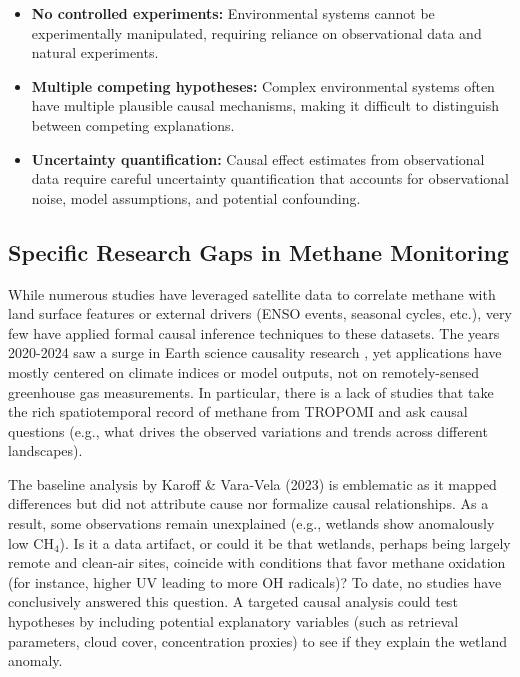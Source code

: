 \begin{itemize}
	\item \textbf{No controlled experiments:} Environmental systems cannot be experimentally manipulated, requiring reliance on observational data and natural experiments.

	\item \textbf{Multiple competing hypotheses:} Complex environmental systems often have multiple plausible causal mechanisms, making it difficult to distinguish between competing explanations.

	\item \textbf{Uncertainty quantification:} Causal effect estimates from observational data require careful uncertainty quantification that accounts for observational noise, model assumptions, and potential confounding.
\end{itemize}

\subsection{Specific Research Gaps in Methane Monitoring}

While numerous studies have leveraged satellite data to correlate methane with land surface features or external drivers (ENSO events, seasonal cycles, etc.), very few have applied formal causal inference techniques to these datasets. The years 2020-2024 saw a surge in Earth science causality research \cite{Runge2019}, yet applications have mostly centered on climate indices or model outputs, not on remotely-sensed greenhouse gas measurements. In particular, there is a lack of studies that take the rich spatiotemporal record of methane from TROPOMI and ask causal questions (e.g., what drives the observed variations and trends across different landscapes).

The baseline analysis by Karoff \& Vara-Vela (2023) \cite{Karoff2023} is emblematic as it mapped differences but did not attribute cause nor formalize causal relationships. As a result, some observations remain unexplained (e.g., wetlands show anomalously low CH$_4$). Is it a data artifact, or could it be that wetlands, perhaps being largely remote and clean-air sites, coincide with conditions that favor methane oxidation (for instance, higher UV leading to more OH radicals)? To date, no studies have conclusively answered this question. A targeted causal analysis could test hypotheses by including potential explanatory variables (such as retrieval parameters, cloud cover,  concentration proxies) to see if they explain the wetland anomaly.


